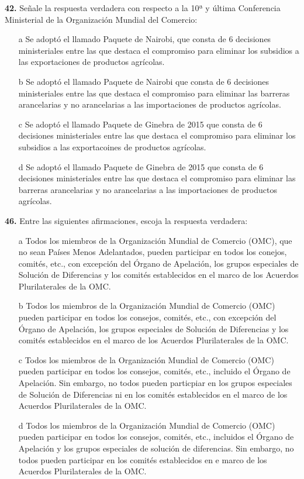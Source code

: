 \documentclass{nuevotema}
\begin{document}

\textbf{42.} Señale la respuesta verdadera con respecto a la 10ª y última Conferencia Ministerial de la Organización Mundial del Comercio:
\begin{itemize}
	\item[a] Se adoptó el llamado Paquete de Nairobi, que consta de 6 decisiones ministeriales entre las que destaca el compromiso para eliminar los subsidios a las exportaciones de productos agrícolas.
	\item[b] Se adoptó el llamado Paquete de Nairobi que consta de 6 decisiones ministeriales entre las que destaca el compromiso para eliminar las barreras arancelarias y no arancelarias a las importaciones de productos agrícolas.
	\item[c] Se adoptó el llamado Paquete de Ginebra de 2015 que consta de 6 decisiones ministeriales entre las que destaca el compromiso para eliminar los subsidios a las exportacoines de productos agrícolas.
	\item[d] Se adoptó el llamado Paquete de Ginebra de 2015 que consta de 6 decisiones ministeriales entre las que destaca el compromiso para eliminar las barreras arancelarias y no arancelarias a las importaciones de productos agrícolas.
\end{itemize}


\textbf{46.} Entre las siguientes afirmaciones, escoja la respuesta verdadera:

\begin{itemize}
	\item[a] Todos los miembros de la Organización Mundial de Comercio (OMC), que no sean Países Menos Adelantados, pueden participar en todos los conejos, comités, etc., con excepción del Órgano de Apelación, los grupos especiales de Solución de Diferencias y los comités establecidos en el marco de los Acuerdos Plurilaterales de la OMC.
	\item[b] Todos los miembros de la Organización Mundial de Comercio (OMC) pueden participar en todos los consejos, comités, etc., con excepción del Órgano de Apelación, los grupos especiales de Solución de Diferencias y los comités establecidos en el marco de los Acuerdos Plurilaterales de la OMC.
	\item[c] Todos los miembros de la Organización Mundial de Comercio (OMC) pueden participar en todos los consejos, comités, etc., incluido el Órgano de Apelación. Sin embargo, no todos pueden particpiar en los grupos especiales de Solución de Diferencias ni en los comités establecidos en el marco de los Acuerdos Plurilaterales de la OMC.
	\item[d] Todos los miembros de la Organización Mundial de Comercio (OMC) pueden participar en todos los consejos, comités, etc., incluidos el Órgano de Apelación y los grupos especiales de solución de diferencias. Sin embargo, no todos pueden participar en los comités establecidos en e marco de los Acuerdos Plurilaterales de la OMC.
\end{itemize}
\end{document}
